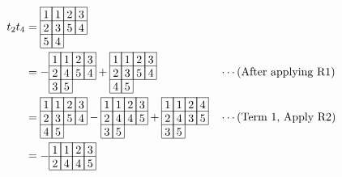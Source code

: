 \begin{align*}
t_2t_4 &= 
\begin{array}[c]{*{4}c}\cline{1-4}
\lr{1}&\lr{1}&\lr{2}&\lr{3}\\\cline{1-4}
\lr{2}&\lr{3}&\lr{5}&\lr{4}\\\cline{1-4}
\lr{5}&\lr{4}\\\cline{1-2}
\end{array}\\
&=
-\begin{array}[c]{*{4}c}\cline{1-4}
\lr{1}&\lr{1}&\lr{2}&\lr{3}\\\cline{1-4}
\lr{2}&\lr{4}&\lr{5}&\lr{4}\\\cline{1-4}
\lr{3}&\lr{5}\\\cline{1-2}
\end{array}
+\begin{array}[c]{*{4}c}\cline{1-4}
\lr{1}&\lr{1}&\lr{2}&\lr{3}\\\cline{1-4}
\lr{2}&\lr{3}&\lr{5}&\lr{4}\\\cline{1-4}
\lr{4}&\lr{5}\\\cline{1-2}
\end{array}
&&\cdots (\text{After applying R1})
\\
&=
\begin{array}[c]{*{4}c}\cline{1-4}
\lr{1}&\lr{1}&\lr{2}&\lr{3}\\\cline{1-4}
\lr{2}&\lr{3}&\lr{5}&\lr{4}\\\cline{1-4}
\lr{4}&\lr{5}\\\cline{1-2}
\end{array}
-\begin{array}[c]{*{4}c}\cline{1-4}
\lr{1}&\lr{1}&\lr{2}&\lr{3}\\\cline{1-4}
\lr{2}&\lr{4}&\lr{4}&\lr{5}\\\cline{1-4}
\lr{3}&\lr{5}\\\cline{1-2}
\end{array}
+\begin{array}[c]{*{4}c}\cline{1-4}
\lr{1}&\lr{1}&\lr{2}&\lr{4}\\\cline{1-4}
\lr{2}&\lr{4}&\lr{3}&\lr{5}\\\cline{1-4}
\lr{3}&\lr{5}\\\cline{1-2}
\end{array}
&&\cdots (\text{Term 1, Apply R2})
\\
&=
-\begin{array}[c]{*{4}c}\cline{1-4}
\lr{1}&\lr{1}&\lr{2}&\lr{3}\\\cline{1-4}
\lr{2}&\lr{4}&\lr{4}&\lr{5}\\\cline{1-4}

\end{array}
\end{align*}
